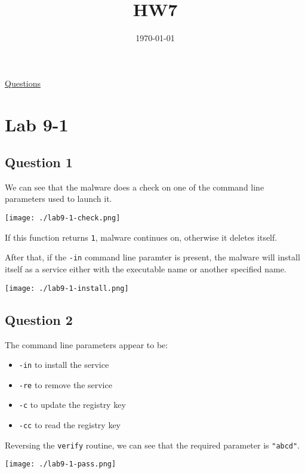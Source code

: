 \documentclass[11pt]{article}
\date{\today}
\title{HW7}
\begin{document}
\maketitle
\tableofcontents

\href{https://docs.google.com/document/d/1D7sqxEZtkl7xTF-tSeeWKc-5s-MkAScSbe2RgpyrOZE/edit}{Questions}
\section{Lab 9-1}
\label{sec:org70ffdab}
\subsection{Question 1}
\label{sec:org4e97f33}
We can see that the malware does a check on one of the command line
parameters used to launch it.

\begin{center}
\texttt{[image: ./lab9-1-check.png]}
\end{center}

If this function returns \texttt{1}, malware continues on, otherwise it
deletes itself.

After that, if the \texttt{-in} command line paramter is present, the malware
will install itself as a service either with the executable name or
another specified name.

\begin{center}
\texttt{[image: ./lab9-1-install.png]}
\end{center}
\subsection{Question 2}
\label{sec:org787c780}
The command line parameters appear to be:

\begin{itemize}
\item \texttt{-in} to install the service
\item \texttt{-re} to remove the service
\item \texttt{-c} to update the registry key
\item \texttt{-cc} to read the registry key
\end{itemize}

Reversing the \texttt{verify} routine, we can see that the required parameter
is \texttt{"abcd"}.

\begin{center}
\texttt{[image: ./lab9-1-pass.png]}
\end{center}
\end{document}
